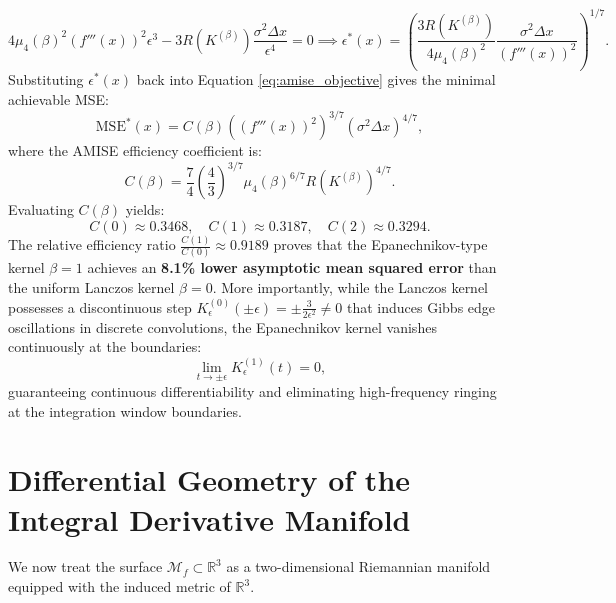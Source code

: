 \documentclass[11pt,a4paper]{article}
\theoremstyle{definition}
\begin{document}
\begin{equation}
4 \mu_4(\beta)^2 (f'''(x))^2 \epsilon^3 - 3 R(K^{(\beta)}) \frac{\sigma^2 \Delta x}{\epsilon^4} = 0 \implies \epsilon^*(x) = \left( \frac{3 R(K^{(\beta)})}{4 \mu_4(\beta)^2} \frac{\sigma^2 \Delta x}{(f'''(x))^2} \right)^{1/7}.
\label{eq:optimal_eps_general_beta}
\end{equation}
Substituting $\epsilon^*(x)$ back into Equation \eqref{eq:amise_objective} gives the minimal achievable MSE:
\begin{equation}
\text{MSE}^*(x) = C(\beta) \left( (f'''(x))^2 \right)^{3/7} (\sigma^2 \Delta x)^{4/7},
\end{equation}
where the AMISE efficiency coefficient is:
\begin{equation}
C(\beta) = \frac{7}{4} \left(\frac{4}{3}\right)^{3/7} \mu_4(\beta)^{6/7} R(K^{(\beta)})^{4/7}.
\end{equation}
Evaluating $C(\beta)$ yields:
\begin{equation}
C(0) \approx 0.3468, \quad C(1) \approx 0.3187, \quad C(2) \approx 0.3294.
\end{equation}
The relative efficiency ratio $\frac{C(1)}{C(0)} \approx 0.9189$ proves that the Epanechnikov-type kernel $\beta = 1$ achieves an \textbf{8.1\% lower asymptotic mean squared error} than the uniform Lanczos kernel $\beta = 0$. More importantly, while the Lanczos kernel possesses a discontinuous step $K_\epsilon^{(0)}(\pm \epsilon) = \pm \frac{3}{2\epsilon^2} \neq 0$ that induces Gibbs edge oscillations in discrete convolutions, the Epanechnikov kernel vanishes continuously at the boundaries:
\begin{equation}
\lim_{t \to \pm \epsilon} K_\epsilon^{(1)}(t) = 0,
\end{equation}
guaranteeing continuous differentiability and eliminating high-frequency ringing at the integration window boundaries.


\section{Differential Geometry of the Integral Derivative Manifold}
\label{sec:geometry}

We now treat the surface $\mathcal{M}_f \subset \mathbb{R}^3$ as a two-dimensional Riemannian manifold equipped with the induced metric of $\mathbb{R}^3$.
\end{document}
